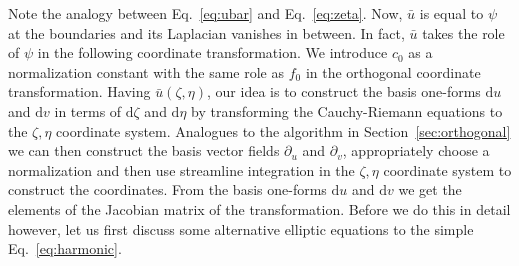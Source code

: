 \documentclass{hitec} %
\renewcommand{\d}{\mathrm{d}}
\begin{document}
Note the analogy between Eq.~\eqref{eq:ubar} and Eq.~\eqref{eq:zeta}. Now, $\bar u$ is
equal to $\psi$ at the boundaries and its Laplacian vanishes in between. 
In fact, $\bar u$ takes the role of $\psi$ in the following coordinate
transformation. 
We introduce $c_0$ as a normalization constant with the same role as $f_0$ in the orthogonal coordinate transformation. 
Having $\bar u(\zeta, \eta)$, 
our idea is to construct the basis one-forms $\d u$ and $\d v$  in terms 
of $\d \zeta$ and $\d \eta$ by transforming the Cauchy-Riemann equations to the
$\zeta, \eta$ coordinate system. Analogues to the algorithm in Section~\ref{sec:orthogonal} we can then construct the basis vector fields $\partial_u$ and $\partial_v$, appropriately choose a normalization and then use streamline
integration in the $\zeta, \eta$ coordinate system to construct the coordinates. 
From the basis one-forms $\d u$ and $\d v$ we get the elements of the Jacobian 
matrix of the transformation. 
Before we do this in detail however, let us first discuss some alternative elliptic
equations to the simple Eq.~\eqref{eq:harmonic}.
\end{document}
